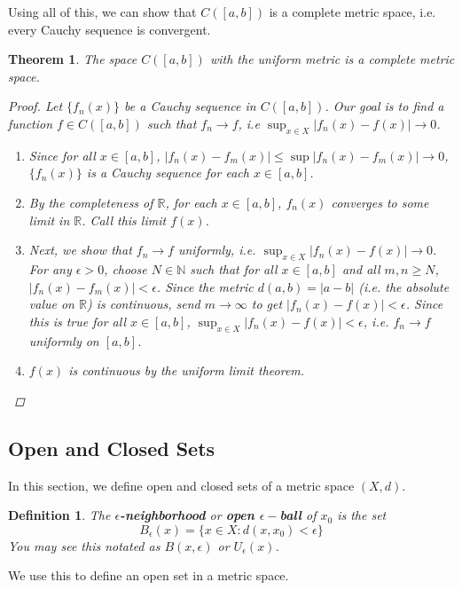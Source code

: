 \documentclass[12pt]{amsart}         %
\newtheorem{definition}{Definition}[section]
\newtheorem{theorem}{Theorem}[section]
\theoremstyle{remark}
\newcommand{\N}{\mathbb{N}}
\newcommand{\R}{\mathbb{R}}
\begin{document}
Using all of this, we can show that $C([a,b])$ is a complete metric space, i.e. every Cauchy sequence is convergent.

\begin{theorem}
The space $C([a,b])$ with the uniform metric is a complete metric space.
\begin{proof}
Let $\{ f_n(x) \}$ be a Cauchy sequence in $C([a,b])$. Our goal is to find a function $f \in C([a,b])$ such that $f_n \rightarrow f$, i.e $\sup_{x \in X}|f_n(x) - f(x)| \rightarrow 0$.
\begin{enumerate}
    \item Since for all $x \in [a,b]$, $| f_n(x) - f_m(x)| \leq \sup| f_n(x) - f_m(x)| \rightarrow 0$, $\{ f_n(x) \}$ is a Cauchy sequence for each $x \in [a,b]$.
    \item By the completeness of $\R$, for each $x \in [a,b]$, $f_n(x)$ converges to some limit in $\R$. Call this limit $f(x)$.
    \item Next, we show that $f_n \rightarrow f$ uniformly, i.e. $\sup_{x \in X}| f_n(x) - f(x)| \rightarrow 0$. For any $\epsilon > 0$, choose $N \in \N$ such that for all $x \in [a, b]$ and all $m, n \geq N$, $|f_n(x) - f_m(x)| < \epsilon$. Since the metric $d(a,b) = |a - b|$ (i.e. the absolute value on $\R$) is continuous, send $m \rightarrow \infty$ to get $|f_n(x) - f(x)| < \epsilon$. Since this is true for all $x \in [a,b]$, $\sup_{x \in X}|f_n(x) - f(x)| < \epsilon$, i.e. $f_n \rightarrow f$ uniformly on $[a,b]$.
    \item $f(x)$ is continuous by the uniform limit theorem.
\end{enumerate}
\end{proof}
\end{theorem}

\subsection{Open and Closed Sets}

In this section, we define open and closed sets of a metric space $(X,d)$.

\begin{definition}
The \textbf{$\epsilon$-neighborhood} or \textbf{open $\epsilon-$ball} of $x_0$ is the set
\[
B_\epsilon(x) = \{ x \in X : d(x,x_0) < \epsilon \}
\]
You may see this notated as $B(x, \epsilon)$ or $U_\epsilon(x)$.
\end{definition}

We use this to define an open set in a metric space.
\end{document}
